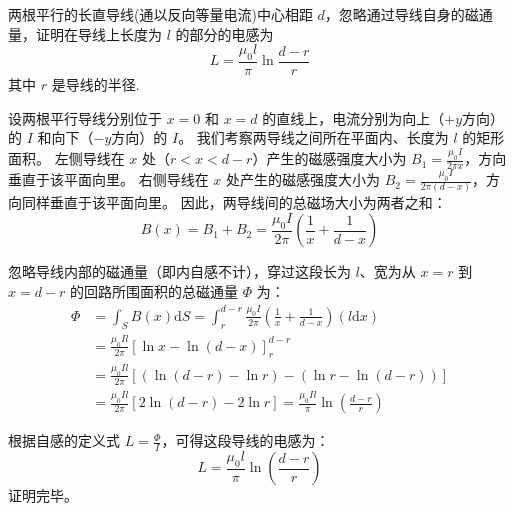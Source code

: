 \begin{exercise}\label{ex:18.4}
两根平行的长直导线(通以反向等量电流)中心相距 $d$，忽略通过导线自身的磁通量，证明在导线上长度为 $l$ 的部分的电感为
$$ L = \frac{\mu_0 l}{\pi} \ln \frac{d-r}{r} $$
其中 $r$ 是导线的半径.
\end{exercise}
\begin{solution}
设两根平行导线分别位于 $x = 0$ 和 $x = d$ 的直线上，电流分别为向上（$+y$方向）的 $I$ 和向下（$-y$方向）的 $I$。
我们考察两导线之间所在平面内、长度为 $l$ 的矩形面积。
左侧导线在 $x$ 处（$r < x < d-r$）产生的磁感强度大小为 $B_1 = \frac{\mu_0 I}{2\pi x}$，方向垂直于该平面向里。
右侧导线在 $x$ 处产生的磁感强度大小为 $B_2 = \frac{\mu_0 I}{2\pi (d-x)}$，方向同样垂直于该平面向里。
因此，两导线间的总磁场大小为两者之和：
$$ B(x) = B_1 + B_2 = \frac{\mu_0 I}{2\pi} \left( \frac{1}{x} + \frac{1}{d-x} \right) $$

忽略导线内部的磁通量（即内自感不计），穿过这段长为 $l$、宽为从 $x=r$ 到 $x=d-r$ 的回路所围面积的总磁通量 $\Phi$ 为：
\begin{align*}
    \Phi &= \int_S B(x) \mathrm{d}S = \int_r^{d-r} \frac{\mu_0 I}{2\pi} \left( \frac{1}{x} + \frac{1}{d-x} \right) (l \mathrm{d}x) \\
         &= \frac{\mu_0 I l}{2\pi} \left[ \ln x - \ln(d-x) \right]_r^{d-r} \\
         &= \frac{\mu_0 I l}{2\pi} \left[ (\ln(d-r) - \ln r) - (\ln r - \ln(d-r)) \right] \\
         &= \frac{\mu_0 I l}{2\pi} \left[ 2\ln(d-r) - 2\ln r \right] = \frac{\mu_0 I l}{\pi} \ln\left( \frac{d-r}{r} \right)
\end{align*}

根据自感的定义式 $L = \frac{\Phi}{I}$，可得这段导线的电感为：
$$ L = \frac{\mu_0 l}{\pi} \ln\left( \frac{d-r}{r} \right) $$
证明完毕。
\end{solution}

